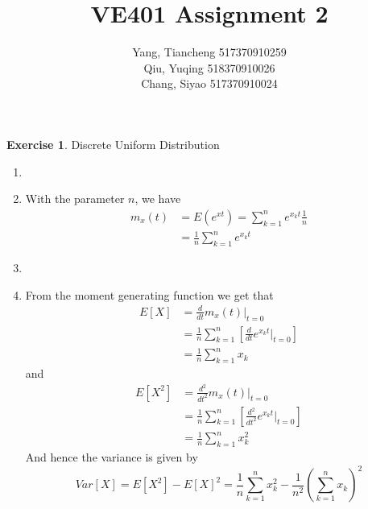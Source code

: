 \documentclass[12pt,a4paper]{article}
\makeatletter
\theoremstyle{definition}
\newtheorem{exercise}{Exercise}
\newtheorem*{solution}{Solution}
\renewenvironment{solution}[1][Solution] {\par\pushQED{\qed}\normalfont\topsep6\p@\@plus6\p@\relax\trivlist\item[\hskip\labelsep\bfseries#1\@addpunct{.}]\ignorespaces}{\popQED\endtrivlist\@endpefalse} \makeatother
\makeatother
\begin{document}
\title{VE401 Assignment 2}
\author{Yang, Tiancheng 517370910259\\Qiu, Yuqing 518370910026\\Chang, Siyao 517370910024}

\maketitle

\newpage

\begin{exercise}
Discrete Uniform Distribution
\begin{enumerate}
    \item 
    \begin{solution}
            With the parameter $n$, we have
            \begin{equation*}
                \begin{split}
                m_x(t)&=E(e^{xt})=\sum_{k=1}^{n} e^{x_k t}\frac{1}{n}\\
                &=\frac{1}{n}\sum_{k=1}^{n} e^{x_k t}
                \end{split}
            \end{equation*}
    \end{solution}
    \item \begin{solution}
        From the moment generating function we get that
        \begin{equation*}
            \begin{split}
            E[X]&=\frac{d}{dt}m_x(t)|_{t=0}\\
            &=\frac{1}{n}\sum_{k=1}^n [\frac{d}{dt}e^{x_k t}|_{t=0}]\\
            &=\frac{1}{n}\sum_{k=1}^n x_k
            \end{split}
        \end{equation*}
        and
        \begin{equation*}
            \begin{split}
            E[X^2]&=\frac{d^2}{dt^2}m_x(t)|_{t=0}\\
            &=\frac{1}{n}\sum_{k=1}^n[\frac{d^2}{dt^2}e^{x_k t}|_{t=0}]\\
            &=\frac{1}{n}\sum_{k=1}^n x_k^2
            \end{split}
        \end{equation*}
        And hence the variance is given by
        \begin{equation*}
            Var[X]=E[X^2]-E[X]^2=\frac{1}{n}\sum_{k=1}^n x_k^2-\frac{1}{n^2}(\sum_{k=1}^n x_k)^2
        \end{equation*}
    \end{solution}
\end{enumerate}
\end{exercise}
\end{document}
